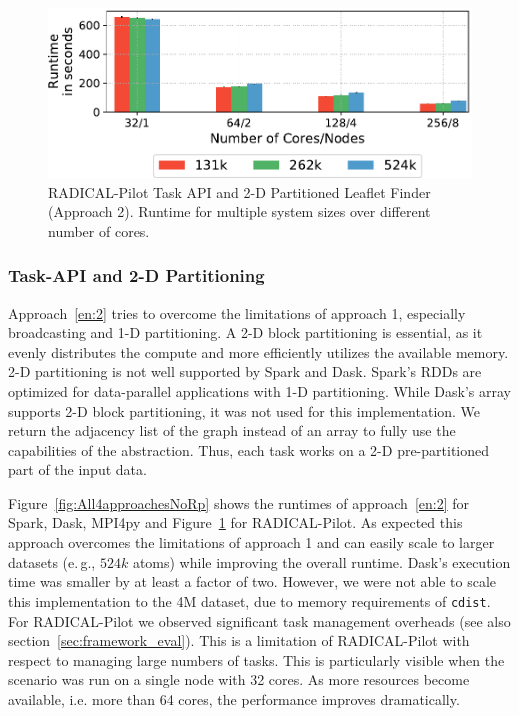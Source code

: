 

\begin{figure}[t]
    \centering
    \includegraphics[width=.75\textwidth]{figures/data_analytics_hpc/task_par/rpLF.pdf}
    \caption{RADICAL-Pilot Task API and 2-D Partitioned Leaflet Finder (Approach 2).
    Runtime for multiple system sizes over different number of cores.}
    \label{fig:rpLF}
\end{figure}

\subsubsection*{Task-API and 2-D Partitioning}
Approach~\ref{en:2} tries to overcome the limitations of approach 1, especially broadcasting and 1-D partitioning.
A 2-D block partitioning is essential, as it evenly distributes the compute and more efficiently utilizes the available memory.
2-D partitioning is not well supported by Spark and Dask.
Spark's RDDs are optimized for data-parallel applications with 1-D partitioning.
While Dask's array supports 2-D block partitioning, it was not used for this implementation.
We return the adjacency list of the graph instead of an array to fully use the capabilities of the abstraction.
Thus, each task works on a 2-D pre-partitioned part of the input data.

Figure~\ref{fig:All4approachesNoRp} shows the runtimes of approach~\ref{en:2} for Spark, Dask, MPI4py and Figure~\ref{fig:rpLF} for RADICAL-Pilot.
As expected this approach overcomes the limitations of approach 1 and can easily scale to larger datasets (e.\,g., $524k$ atoms) while improving the overall runtime.
Dask's execution time was smaller by at least a factor of two.
However, we were not able to scale this implementation to the 4M dataset, due to memory requirements of \texttt{cdist}.
For RADICAL-Pilot we observed significant task management overheads (see also section~\ref{sec:framework_eval}).
This is a limitation of RADICAL-Pilot with respect to managing large numbers of tasks.
This is particularly visible when the scenario was run on a single node with 32 cores.
As more resources become available, i.e. more than 64 cores, the performance improves dramatically.


